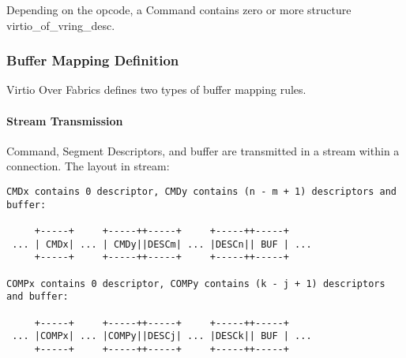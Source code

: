 Depending on the opcode, a Command contains zero or more structure virtio_of_vring_desc.

\subsubsection{Buffer Mapping Definition}\label{sec:Virtio Transport Options / Virtio Over Fabrics / Transmission Protocol / Buffer Mapping Definition}
Virtio Over Fabrics defines two types of buffer mapping rules.

\paragraph{Stream Transmission}\label{sec:Virtio Transport Options / Virtio Over Fabrics / Transmission Protocol / Commands Definition / Stream Transmission}
Command, Segment Descriptors, and buffer are transmitted in a stream within a
connection. The layout in stream:

\begin{lstlisting}
CMDx contains 0 descriptor, CMDy contains (n - m + 1) descriptors and buffer:

     +-----+     +-----++-----+     +-----++-----+
 ... | CMDx| ... | CMDy||DESCm| ... |DESCn|| BUF | ...
     +-----+     +-----++-----+     +-----++-----+

COMPx contains 0 descriptor, COMPy contains (k - j + 1) descriptors and buffer:

     +-----+     +-----++-----+     +-----++-----+
 ... |COMPx| ... |COMPy||DESCj| ... |DESCk|| BUF | ...
     +-----+     +-----++-----+     +-----++-----+
\end{lstlisting}

